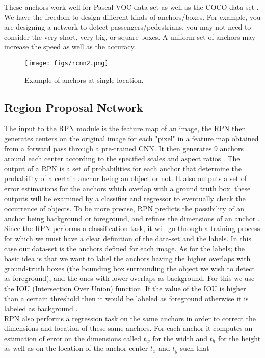 These anchors work well for Pascal VOC \cite{b19} data set as well as the COCO data set \cite{b18}. We have the freedom to design different kinds of anchors/boxes. For example, you are designing a network to detect passengers/pedestrians, you may not need to consider the very short, very big, or square boxes. A uniform set of anchors may increase the speed as well as the accuracy.

\begin{figure}[!htpb]
	\centering
	\texttt{[image: figs/rcnn2.png]}
	\caption{Example of anchors at single location.}\label{fig:rcnn2}
\end{figure}

\subsection{Region Proposal Network}
The input to the RPN module is the feature map of an image, the RPN then generates centers on the original image for each "pixel" in a feature map obtained from a forward pass through a pre-trained CNN. It then generates 9 anchors around each center according to the specified scales and aspect ratios \cite{b1}.
The output of a RPN is a set of probabilities  for each anchor that determine the probability of a certain anchor being an object or not. It also outputs a set of error estimations for the anchors which overlap with a ground truth box. these outputs will be examined by a classifier and regressor to eventually check the occurrence of objects. To be more precise, RPN predicts the possibility of an anchor being background or foreground, and refines the dimensions of an anchor \cite{b1}.
Since the RPN performs a classification task, it will go through a training process for which we must have a clear definition of the data-set and the labels. In this case our data-set is the anchors defined for each image. As for the labels; the basic idea is that we want to label the anchors having the higher overlaps with ground-truth boxes (the bounding box surrounding the object we wish to detect  as foreground), and the ones with lower overlaps as background. For this we use the IOU (Intersection Over Union) function. If the value of the IOU is higher than a certain threshold then it would be labeled as foreground otherwise it is labeled as background \cite{b1}. \\

RPN also performs a regression task on the same anchors in order to correct the dimensions and location of these same anchors. For each anchor it computes an estimation of error on the dimensions called $t_{w}$ for the width and $t_{h}$ for the height as well as on the location of the anchor center $t_{x}$ and $t_{y}$ such that

